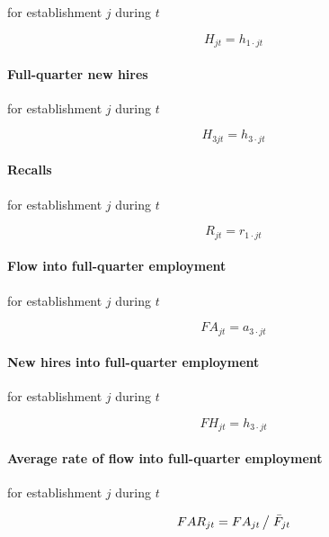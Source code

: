 for establishment $j$ during $t$

\begin{equation}
H_{jt}=h_{1\cdot jt}
\end{equation}

\paragraph{Full-quarter new hires}

for establishment $j$ during $t$

\begin{equation}
H_{3jt}=h_{3\cdot jt}
\end{equation}

\paragraph{Recalls}

for establishment $j$ during $t$

\begin{equation}
R_{jt} = r_{1\cdot jt}
\end{equation}

\paragraph{Flow into full-quarter employment}

for establishment $j$ during $t$

\begin{equation}
FA_{jt}=a_{3\cdot jt}
\end{equation}

\paragraph{New hires into full-quarter employment}

for establishment $j$ during $t$

\begin{equation}
FH_{jt}=h_{3\cdot jt}
\end{equation}

\paragraph{Average rate of flow into full-quarter employment}

for establishment $j$ during $t$

\begin{equation}
FAR_{jt} = {FA_{jt} } \left/ {\vphantom {{FA_{jt} } {\bar {F}_{jt} }}}
\right. {\bar {F}_{jt} }
\end{equation}

